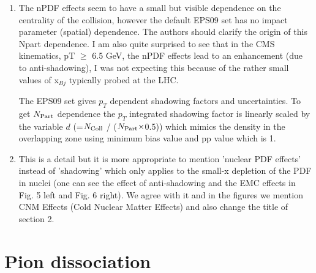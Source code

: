 \documentclass[aps,prc,preprint,superscriptaddress,showpacs,showkeys]{revtex4-1}
\begin{document}
\begin{enumerate}
{}

\item { \color{red} The nPDF effects seem to have a small but visible dependence on the
centrality of the collision, however the default EPS09 set has no
impact parameter (spatial) dependence. The authors should clarify the
origin of this Npart dependence. I am also quite surprised to see that
in the CMS kinematics, pT $\geq$ 6.5 GeV, the nPDF effects lead to an
enhancement (due to anti-shadowing), I was not expecting this because
of the rather small values of x$_{Bj}$ typically probed at the LHC.}

{
\color{blue} 

 The EPS09 set gives $p_T$ dependent shadowing factors and uncertainties. 
 To get $N_{\rm Part}$ dependence the $p_T$ integrated shadowing factor is linearly scaled by the 
variable $d$ (=$N_{\rm Coll}$ / ($N_{\rm Part}\times$0.5)) which mimics the density in the overlapping 
zone using minimum bias value and pp value which is 1.

 }


\item { \color{red} This is a detail but it is more appropriate to mention 'nuclear PDF
effects' instead of 'shadowing' which only applies to the small-x
depletion of the PDF in nuclei (one can see the effect of
anti-shadowing and the EMC effects in Fig. 5 left and Fig. 6 right).}
{\color{blue} We agree with it and in the figures we mention CNM Effects (Cold
Nuclear Matter Effects) and also change the title of section 2. }

\end{enumerate}


\section{Pion dissociation}
\end{document}

